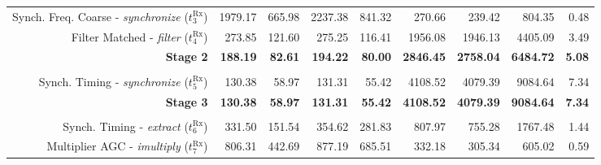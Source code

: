 \begin{table}[htp]
{{\begin{tabular}{r | r r r r  | r r r | r}
    \rowcolor{Paired-7!15}
              Synch. Freq. Coarse -   \emph{synchronize} ($t^\text{Rx}_{3}$)  &         1979.17  &           665.98  &          2237.38  &                                 841.32  &           270.66  &           239.42  &           804.35  &          0.48  \\
    \rowcolor{Paired-7!15}
                   Filter Matched -        \emph{filter} ($t^\text{Rx}_{4}$)  &          273.85  &           121.60  &           275.25  &                                 116.41  &          1956.08  &          1946.13  &          4405.09  &          3.49  \\ \hline
                                                             \textbf{Stage 2} &  \textbf{188.19} &    \textbf{82.61} &   \textbf{194.22} &                          \textbf{80.00} &  \textbf{2846.45} &  \textbf{2758.04} &  \textbf{6484.72} & \textbf{5.08}  \\ %
                                                                              &                  &                   &                   &                                         &                   &                   &                   &                \\
    \rowcolor{Paired-7!15}
                   Synch. Timing  -   \emph{synchronize} ($t^\text{Rx}_{5}$)  &          130.38  &            58.97  &           131.31  &                                  55.42  &          4108.52  &          4079.39  &          9084.64  &          7.34  \\ \hline
    \rowcolor{Paired-5!15}                                   \textbf{Stage 3} &  \textbf{130.38} &    \textbf{58.97} &   \textbf{131.31} &                          \textbf{55.42} &  \textbf{4108.52} &  \textbf{4079.39} &  \textbf{9084.64} &  \textbf{7.34} \\ %
                                                                              &                  &                   &                   &                                         &                   &                   &                   &                \\
    \rowcolor{Paired-7!15}
                    Synch. Timing -       \emph{extract} ($t^\text{Rx}_{6}$)  &          331.50  &           151.54  &           354.62  &                                 281.83  &           807.97  &           755.28  &          1767.48  &          1.44  \\
                   Multiplier AGC -     \emph{imultiply} ($t^\text{Rx}_{7}$)  &          806.31  &           442.69  &           877.19  &                                 685.51  &           332.18  &           305.34  &           605.02  &          0.59  \\

\end{tabular}}}
\end{table}
